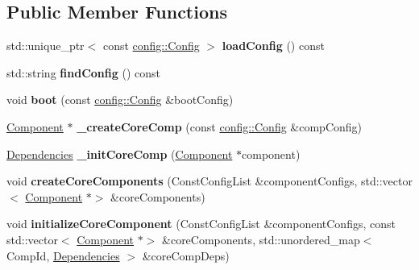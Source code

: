 \subsection*{Public Member Functions}
\begin{DoxyCompactItemize}
\item 
\mbox{\label{classtheoria_1_1core_1_1Bootstrap_a3ed8e5694e2a5d9136ad00c8eeb13022}} 
std\+::unique\+\_\+ptr$<$ const \hyperlink{classtheoria_1_1config_1_1Config}{config\+::\+Config} $>$ {\bfseries load\+Config} () const
\item 
\mbox{\label{classtheoria_1_1core_1_1Bootstrap_a8bc0d6ee72439172ca309df9fb7bf094}} 
std\+::string {\bfseries find\+Config} () const
\item 
\mbox{\label{classtheoria_1_1core_1_1Bootstrap_acfcc189dd0c09ed9052917ef7ce24565}} 
void {\bfseries boot} (const \hyperlink{classtheoria_1_1config_1_1Config}{config\+::\+Config} \&boot\+Config)
\item 
\mbox{\label{classtheoria_1_1core_1_1Bootstrap_a6154c7bce057f6fe41a98ab52b33b32e}} 
\hyperlink{classtheoria_1_1core_1_1Component}{Component} $\ast$ {\bfseries \+\_\+create\+Core\+Comp} (const \hyperlink{classtheoria_1_1config_1_1Config}{config\+::\+Config} \&comp\+Config)
\item 
\mbox{\label{classtheoria_1_1core_1_1Bootstrap_a0b53268afd49fabdba3fa2bd7705bbfa}} 
\hyperlink{classtheoria_1_1core_1_1Dependencies}{Dependencies} {\bfseries \+\_\+init\+Core\+Comp} (\hyperlink{classtheoria_1_1core_1_1Component}{Component} $\ast$component)
\item 
\mbox{\label{classtheoria_1_1core_1_1Bootstrap_a7579f7dd6c9304a317e01123ba2636a7}} 
void {\bfseries create\+Core\+Components} (Const\+Config\+List \&component\+Configs, std\+::vector$<$ \hyperlink{classtheoria_1_1core_1_1Component}{Component} $\ast$$>$ \&core\+Components)
\item 
\mbox{\label{classtheoria_1_1core_1_1Bootstrap_a664811a1d1de36276864160f56c12a19}} 
void {\bfseries initialize\+Core\+Component} (Const\+Config\+List \&component\+Configs, const std\+::vector$<$ \hyperlink{classtheoria_1_1core_1_1Component}{Component} $\ast$$>$ \&core\+Components, std\+::unordered\+\_\+map$<$ Comp\+Id, \hyperlink{classtheoria_1_1core_1_1Dependencies}{Dependencies} $>$ \&core\+Comp\+Deps)

\end{DoxyCompactItemize}
